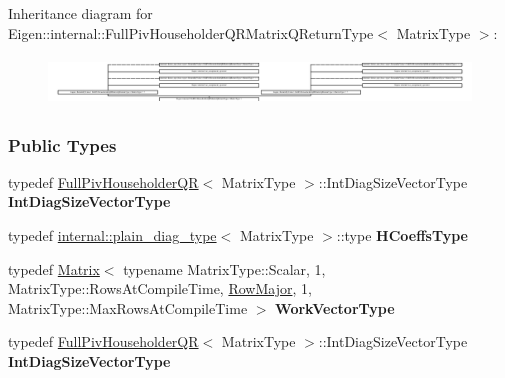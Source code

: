 Inheritance diagram for Eigen\+:\+:internal\+:\+:Full\+Piv\+Householder\+Q\+R\+Matrix\+Q\+Return\+Type$<$ Matrix\+Type $>$\+:\begin{figure}[H]
\begin{center}
\leavevmode
\includegraphics[height=1.292308cm]{group___q_r___module}
\end{center}
\end{figure}
\subsubsection*{Public Types}
\begin{DoxyCompactItemize}
\item 
\mbox{\label{group___q_r___module_a2106e3e1d3cbf5699f5a1f41ea01f802}} 
typedef \hyperlink{group___q_r___module_class_eigen_1_1_full_piv_householder_q_r}{Full\+Piv\+Householder\+QR}$<$ Matrix\+Type $>$\+::Int\+Diag\+Size\+Vector\+Type {\bfseries Int\+Diag\+Size\+Vector\+Type}
\item 
\mbox{\label{group___q_r___module_a9c6c57160a8ed7c06d5947d723f6ff94}} 
typedef \hyperlink{struct_eigen_1_1internal_1_1plain__diag__type}{internal\+::plain\+\_\+diag\+\_\+type}$<$ Matrix\+Type $>$\+::type {\bfseries H\+Coeffs\+Type}
\item 
\mbox{\label{group___q_r___module_a07f618acb4fada7e8d4017d7e341f4ec}} 
typedef \hyperlink{group___core___module_class_eigen_1_1_matrix}{Matrix}$<$ typename Matrix\+Type\+::\+Scalar, 1, Matrix\+Type\+::\+Rows\+At\+Compile\+Time, \hyperlink{group__enums_ggaacded1a18ae58b0f554751f6cdf9eb13acfcde9cd8677c5f7caf6bd603666aae3}{Row\+Major}, 1, Matrix\+Type\+::\+Max\+Rows\+At\+Compile\+Time $>$ {\bfseries Work\+Vector\+Type}
\item 
\mbox{\label{group___q_r___module_a2106e3e1d3cbf5699f5a1f41ea01f802}} 
typedef \hyperlink{group___q_r___module_class_eigen_1_1_full_piv_householder_q_r}{Full\+Piv\+Householder\+QR}$<$ Matrix\+Type $>$\+::Int\+Diag\+Size\+Vector\+Type {\bfseries Int\+Diag\+Size\+Vector\+Type}
\item 
\mbox{\label{group___q_r___module_a9c6c57160a8ed7c06d5947d723f6ff94}} 

\end{DoxyCompactItemize}
